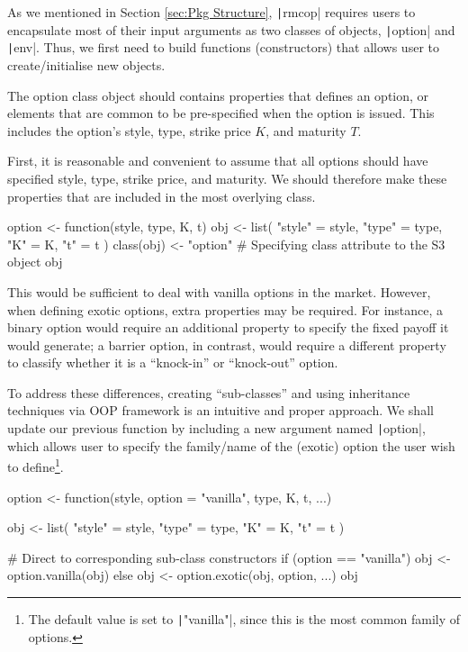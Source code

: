 As we mentioned in Section \ref{sec:Pkg Structure}, \texttt|rmcop| requires users to encapsulate most of their input arguments as two classes of objects, \texttt|option| and \texttt|env|. Thus, we first need to build functions (constructors) that allows user to create/initialise new objects.

The option class object should contains properties that defines an option, or elements that are common to be pre-specified when the option is issued. This includes the option's style, type, strike price $K$, and maturity $T$.

First, it is reasonable and convenient to assume that all options should have specified style, type, strike price, and maturity. We should therefore make these properties that are included in the most overlying class.

\begin{Rminted}
option <- function(style, type, K, t) {
    obj <- list(
        "style" = style,
        "type" = type,
        "K" = K,
        "t" = t
    )
    class(obj) <- "option" # Specifying class attribute to the S3 object
    obj
}
\end{Rminted}

This would be sufficient to deal with vanilla options in the market. However, when defining exotic options, extra properties may be required. For instance, a binary option would require an additional property to specify the fixed payoff it would generate; a barrier option, in contrast, would require a different property to classify whether it is a ``knock-in'' or ``knock-out'' option.

To address these differences, creating ``sub-classes'' and using inheritance techniques via OOP framework is an intuitive and proper approach. We shall update our previous function by including a new argument named \texttt|option|, which allows user to specify the family/name of the (exotic) option the user wish to define\footnote{The default value is set to \texttt|"vanilla"|, since this is the most common family of options.}.

\begin{Rminted}
option <- function(style, option = "vanilla", type, K, t, ...) {

    obj <- list(
        "style" = style,
        "type" = type,
        "K" = K,
        "t" = t
    )

    # Direct to corresponding sub-class constructors
    if (option == "vanilla") {
        obj <- option.vanilla(obj)
    } else {
        obj <- option.exotic(obj, option, ...)
    }
    obj
}
\end{Rminted}

